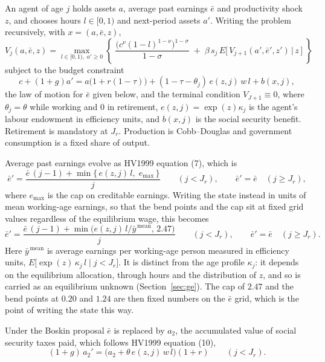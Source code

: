 \documentclass[11pt,fleqn]{article}
\begin{document}
An agent of age $j$ holds assets $a$, average past earnings $\bar{e}$ and productivity shock
$z$, and chooses hours $l\in[0,1)$ and next-period assets $a'$. Writing the problem
recursively, with $x=(a,\bar{e},z)$,
\begin{equation*}
 V_j(a,\bar{e},z) = \max_{l\in[0,1),\;a'\ge 0}
   \left\{\; \frac{\big(c^{\nu}(1-l)^{1-\nu}\big)^{1-\sigma}}{1-\sigma}
   \;+\; \beta\, s_j\, E\big[\,V_{j+1}(a',\bar{e}',z') \,\big|\, z\,\big] \;\right\}
\end{equation*}
subject to the budget constraint
\begin{equation*}
 c + (1+g)a' = a\big(1+r(1-\tau)\big) + (1-\tau-\theta_j)\,e(z,j)\,w\,l + b(x,j),
\end{equation*}
the law of motion for $\bar{e}$ given below, and the terminal condition $V_{J+1}\equiv 0$,
where $\theta_j=\theta$ while working and $0$ in retirement, $e(z,j)=\exp(z)\kappa_j$ is the
agent's labour endowment in efficiency units, and $b(x,j)$ is the social security benefit.
Retirement is mandatory at $J_r$. Production is Cobb--Douglas and government consumption is
a fixed share of output.

Average past earnings evolve as HV1999 equation (7), which is
\begin{equation*}
 \bar{e}' = \frac{\bar{e}\,(j-1) + \min\{\,e(z,j)\,l,\; e_{\max}\,\}}{j}
 \qquad (j<J_r), \qquad \bar{e}'=\bar{e} \quad (j\ge J_r),
\end{equation*}
where $e_{\max}$ is the cap on creditable earnings. Writing the state instead in units of mean
working-age earnings, so that the bend points and the cap sit at fixed grid values regardless
of the equilibrium wage, this becomes
\begin{equation*}
 \bar{e}' = \frac{\bar{e}\,(j-1) + \min\!\big(e(z,j)\,l/\bar{y}^{\,\text{mean}},\,2.47\big)}{j}
 \qquad (j<J_r), \qquad \bar{e}'=\bar{e} \quad (j\ge J_r).
\end{equation*}
Here $\bar{y}^{\,\text{mean}}$ is average earnings per working-age person measured in
efficiency units, $E\big[\exp(z)\,\kappa_j\,l \mid j<J_r\big]$. It is distinct from the
age profile $\kappa_j$: it depends on the equilibrium allocation, through hours and the
distribution of $z$, and so is carried as an equilibrium unknown (Section~\ref{sec:ge}). The
cap of $2.47$ and the bend points at $0.20$ and $1.24$ are then fixed numbers on the
$\bar{e}$ grid, which is the point of writing the state this way.

Under the Boskin proposal $\bar{e}$ is replaced by $a_2$, the accumulated value of social
security taxes paid, which follows HV1999 equation (10),
\begin{equation*}
 (1+g)\,a_2' = \big(a_2 + \theta\, e(z,j)\, w\, l\big)(1+r) \qquad (j<J_r).
\end{equation*}
\end{document}
